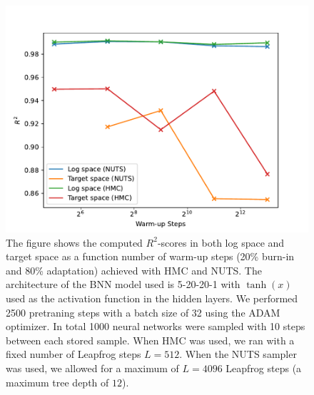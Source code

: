 \begin{figure}[h!]
    \centering
    \includegraphics[scale=0.7]{figures/r2_scores/effect_of_burnin_r2_scores.pdf}
    \caption{
        The figure shows the computed $R^2$-scores in both log space and target space as a function number of warm-up steps (20\% burn-in and 80\% adaptation) achieved with HMC and NUTS. The architecture of the BNN model used is 5-20-20-1 with $\tanh(x)$ used as the activation function in the hidden layers. We performed 2500 pretraning steps with a batch size of 32 using the ADAM optimizer. In total 1000 neural networks were sampled with 10 steps between each stored sample. When HMC was used, we ran with a fixed number of Leapfrog steps $L = 512$. When the NUTS sampler was used, we allowed for a maximum of $L = 4096$ Leapfrog steps (a maximum tree depth of $12$).
    }
    \label{fig:r2_score_vs_burn_in_steps}
\end{figure}


